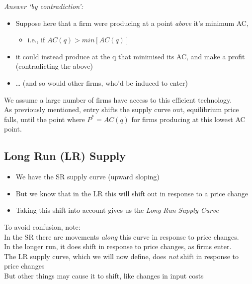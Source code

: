 \documentclass[]{article}
\providecommand{\tightlist}{%
  \setlength{\itemsep}{0pt}\setlength{\parskip}{0pt}}
\begin{document}
\bigskip

\emph{Answer `by contradiction':}

\begin{itemize}
\item
  Suppose here that a firm were producing at a point \emph{above} it's
  minimum AC,

  \begin{itemize}
  \tightlist
  \item
    i.e., if \(AC(q)> min [AC(q)]\)
  \end{itemize}
\item
  it could instead produce at the q that minimised its AC, and make a
  profit (contradicting the above)
\item
  \ldots{} (and so would other firms, who'd be induced to enter)
\end{itemize}

We assume a large number of firms have access to this efficient
technology.\\
As previously mentioned, entry shifts the supply curve out, equilibrium
price falls, until the point where \(P^*=AC(q)\) for firms producing at
this lowest AC point.

\hypertarget{long-run-lr-supply}{%
\subsection{Long Run (LR) Supply}\label{long-run-lr-supply}}

\begin{itemize}
\tightlist
\item
  We have the SR supply curve (upward sloping)
\item
  But we know that in the LR this will shift out in response to a price
  change
\item
  Taking this shift into account gives us the \emph{Long Run Supply
  Curve}
\end{itemize}

To avoid confusion, note:\\
In the SR there are movements \emph{along} this curve in response to
price changes.\\
In the longer run, it does shift in response to price changes, as firms
enter.\\
The LR supply curve, which we will now define, does \emph{not} shift in
response to price changes\\
But other things may cause it to shift, like changes in input costs
\end{document}
